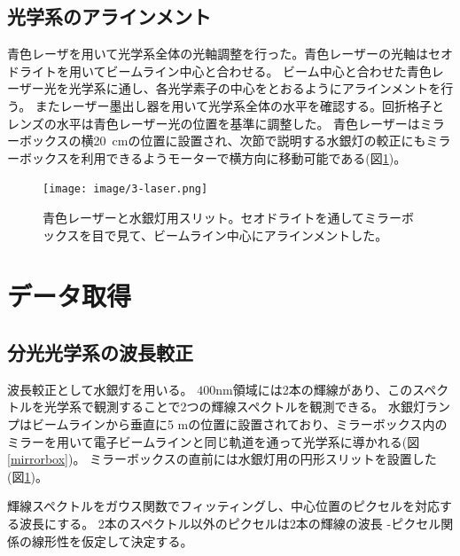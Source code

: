 \documentclass[a4paper,11pt,uplatex]{jsbook}
\begin{document}
\subsection{光学系のアラインメント}
青色レーザを用いて光学系全体の光軸調整を行った。青色レーザーの光軸はセオドライトを用いてビームライン中心と合わせる。
ビーム中心と合わせた青色レーザー光を光学系に通し、各光学素子の中心をとおるようにアラインメントを行う。
またレーザー墨出し器を用いて光学系全体の水平を確認する。回折格子とレンズの水平は青色レーザー光の位置を基準に調整した。
青色レーザーはミラーボックスの横20~cmの位置に設置され、次節で説明する水銀灯の較正にもミラーボックスを利用できるようモーターで横方向に移動可能である(図\ref{laser})。
\begin{figure}
  \centering
  \texttt{[image: image/3-laser.png]}\\
  \caption[青色レーザー]{青色レーザーと水銀灯用スリット。セオドライトを通してミラーボックスを目で見て、ビームライン中心にアラインメントした。}
  \label{laser}
\end{figure}
\section{データ取得}


\subsection{分光光学系の波長較正}
波長較正として水銀灯を用いる。
$400 \text{nm}$領域には2本の輝線があり、このスペクトルを光学系で観測することで2つの輝線スペクトルを観測できる。
水銀灯ランプはビームラインから垂直に5 mの位置に設置されており、ミラーボックス内のミラーを用いて電子ビームラインと同じ軌道を通って光学系に導かれる(図\ref{mirrorbox})。
ミラーボックスの直前には水銀灯用の円形スリットを設置した(図\ref{laser})。

輝線スペクトルをガウス関数でフィッティングし、中心位置のピクセルを対応する波長にする。
2本のスペクトル以外のピクセルは2本の輝線の波長 -ピクセル関係の線形性を仮定して決定する。
\end{document}
